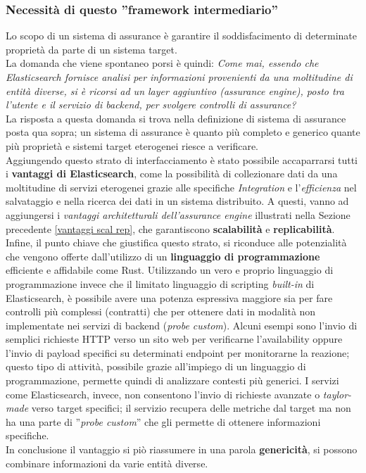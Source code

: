 \subsubsection{Necessità di questo ''framework intermediario''}
Lo scopo di un sistema di assurance è garantire il soddisfacimento di determinate proprietà da parte di un sistema target. \\
La domanda che viene spontaneo porsi è quindi:
\textit{Come mai, essendo che Elasticsearch fornisce analisi per informazioni provenienti da una moltitudine di entità diverse, si è ricorsi ad un layer aggiuntivo (assurance engine), posto tra l'utente e il servizio di backend, per svolgere controlli di assurance?} \\
La risposta a questa domanda si trova nella definizione di sistema di assurance posta qua sopra; un sistema di assurance è quanto più completo e generico quante più proprietà e sistemi target eterogenei riesce a verificare. \\
Aggiungendo questo strato di interfacciamento è stato possibile accaparrarsi tutti i \textbf{vantaggi di Elasticsearch}, come la possibilità di collezionare dati da una moltitudine di servizi eterogenei grazie alle specifiche \textit{Integration} e l'\textit{efficienza} nel salvataggio e nella ricerca dei dati in un sistema distribuito.
A questi, vanno ad aggiungersi i \emph{vantaggi architetturali dell'assurance engine} illustrati nella Sezione precedente \ref{vantaggi scal rep}, che garantiscono \textbf{scalabilità} e \textbf{replicabilità}.
Infine, il punto chiave che giustifica questo strato, si riconduce alle potenzialità che vengono offerte dall'utilizzo di un \textbf{linguaggio di programmazione} efficiente e affidabile come Rust.
Utilizzando un vero e proprio linguaggio di programmazione invece che il limitato linguaggio di scripting \textit{built-in} di Elasticsearch, è possibile avere una potenza espressiva maggiore sia per fare controlli più complessi (contratti) che per ottenere dati in modalità non implementate nei servizi di backend (\textit{probe custom}). Alcuni esempi sono l'invio di semplici richieste HTTP verso un sito web per verificarne l'availability oppure l'invio di payload specifici su determinati endpoint per monitorarne la reazione; questo tipo di attività, possibile grazie all'impiego di un linguaggio di programmazione, permette quindi di analizzare contesti più generici.
I servizi come Elasticsearch, invece, non consentono l'invio di richieste avanzate o \textit{taylor-made} verso target specifici; il servizio recupera delle metriche dal target ma non ha una parte di ''\textit{probe custom}'' che gli permette di ottenere informazioni specifiche. \\
In conclusione il vantaggio si piò riassumere in una parola \textbf{genericità}, si possono combinare informazioni da varie entità diverse.


